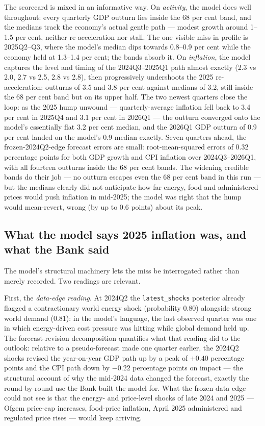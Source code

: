 The scorecard is mixed in an informative way. On \emph{activity}, the model does well throughout: every quarterly GDP outturn lies inside the 68 per cent band, and the medians track the economy's actual gentle path --- modest growth around 1--1.5 per cent, neither re-acceleration nor stall. The one visible miss in profile is 2025Q2--Q3, where the model's median dips towards 0.8--0.9 per cent while the economy held at 1.3--1.4 per cent; the bands absorb it. On \emph{inflation}, the model captures the level and timing of the 2024Q3--2025Q1 path almost exactly (2.3 vs 2.0, 2.7 vs 2.5, 2.8 vs 2.8), then progressively undershoots the 2025 re-acceleration: outturns of 3.5 and 3.8 per cent against medians of 3.2, still inside the 68 per cent band but on its upper half. The two newest quarters close the loop: as the 2025 hump unwound --- quarterly-average inflation fell back to 3.4 per cent in 2025Q4 and 3.1 per cent in 2026Q1 --- the outturn converged onto the model's essentially flat 3.2 per cent median, and the 2026Q1 GDP outturn of 0.9 per cent landed on the model's 0.9 median exactly. Seven quarters ahead, the frozen-2024Q2-edge forecast errors are small: root-mean-squared errors of 0.32 percentage points for both GDP growth and CPI inflation over 2024Q3--2026Q1, with all fourteen outturns inside the 68 per cent bands. The widening credible bands do their job --- no outturn escapes even the 68 per cent band in this run --- but the medians clearly did not anticipate how far energy, food and administered prices would push inflation in mid-2025; the model was right that the hump would mean-revert, wrong (by up to 0.6 points) about its peak.

\subsection{What the model says 2025 inflation was, and what the Bank said}

The model's structural machinery lets the miss be interrogated rather than merely recorded. Two readings are relevant.

First, the \emph{data-edge reading}. At 2024Q2 the \texttt{latest\_shocks} posterior already flagged a contractionary world energy shock (probability 0.80) alongside strong world demand (0.81): in the model's language, the last observed quarter was one in which energy-driven cost pressure was hitting while global demand held up. The forecast-revision decomposition quantifies what that reading did to the outlook: relative to a pseudo-forecast made one quarter earlier, the 2024Q2 shocks revised the year-on-year GDP path up by a peak of $+0.40$ percentage points and the CPI path down by $-0.22$ percentage points on impact --- the structural account of why the mid-2024 data changed the forecast, exactly the round-by-round use the Bank built the model for. What the frozen data edge could not see is that the energy- and price-level shocks of late 2024 and 2025 --- Ofgem price-cap increases, food-price inflation, April 2025 administered and regulated price rises --- would keep arriving.

